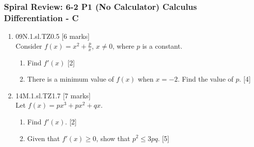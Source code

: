 \documentclass[12pt, twoside]{article}
\begin{document}
\subsubsection*{Spiral Review: 6-2 P1 (No Calculator) Calculus Differentiation - C}
  \begin{enumerate}

  \item 09N.1.sl.TZ0.5 \hfill [6 marks]\\
    Consider $f(x)= x^2+\frac{p}{x}$, $x \neq 0$, where $p$ is a constant.
    \begin{enumerate}
      \item Find $f'(x)$ \hfill [2]
      \item There is a minimum value of $f(x)$ when $x=-2$. Find the value of $p$. \hfill [4]
    \end{enumerate} \vspace{1cm}

  \item 14M.1.sl.TZ1.7 \hfill [7 marks]\\
    Let $f(x)= px^3 + px^2 + qx$.
    \begin{enumerate}
      \item Find $f'(x)$. \hfill [2]
      \item Given that $f'(x) \geq 0$, show that $p^2 \leq 3pq$. \hfill [5]
    \end{enumerate}  \vspace{1cm}


\end{enumerate}
\end{document}
